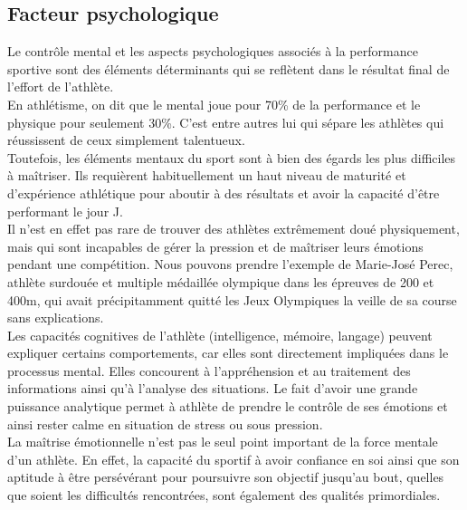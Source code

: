                 
        \subsection{Facteur psychologique}

            Le contrôle mental et les aspects psychologiques associés à la performance sportive sont des éléments déterminants qui se reflètent dans le résultat final de l'effort de l'athlète.\\
            
            En athlétisme, on dit que le mental joue pour 70\% de la performance et le physique pour seulement 30\%. C'est entre autres lui qui sépare les athlètes qui réussissent de ceux simplement talentueux. \\
            
            Toutefois, les éléments mentaux du sport sont à bien des égards les plus difficiles à maîtriser. Ils requièrent habituellement un haut niveau de maturité et d'expérience athlétique pour aboutir à des résultats et avoir la capacité d'être performant le jour J.\\
            
            Il n'est en effet pas rare de trouver des athlètes extrêmement doué physiquement, mais qui sont incapables de gérer la pression et de maîtriser leurs émotions pendant une compétition. Nous pouvons prendre l'exemple de Marie-José Perec, athlète surdouée et multiple médaillée olympique dans les épreuves de 200 et 400m, qui avait précipitamment quitté les Jeux Olympiques la veille de sa course sans explications.\\
            
            Les capacités cognitives de l'athlète (intelligence, mémoire, langage) peuvent expliquer certains comportements, car elles sont directement impliquées dans le processus mental. Elles concourent à l’appréhension et au traitement des informations ainsi qu'à l’analyse des situations. Le fait d'avoir une grande puissance analytique permet à athlète de prendre le contrôle de ses émotions et ainsi rester calme en situation de stress ou sous pression.\\
         
            La maîtrise émotionnelle n'est pas le seul point important de la force mentale d'un athlète. En effet, la capacité du sportif à avoir confiance en soi ainsi que son aptitude à être persévérant pour poursuivre son objectif jusqu’au bout, quelles que soient les difficultés rencontrées, sont également des qualités primordiales.\\
            
